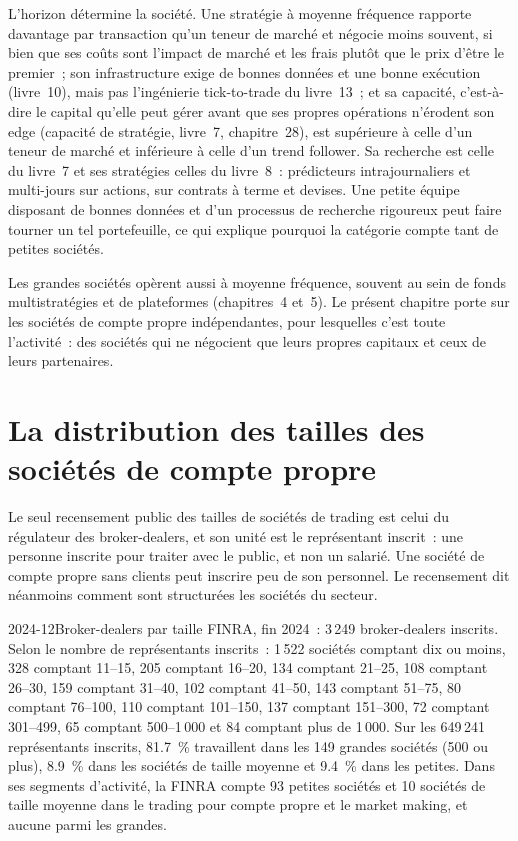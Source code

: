 L'horizon détermine la société. Une stratégie à moyenne fréquence rapporte davantage par transaction qu'un teneur de marché et négocie moins
souvent, si bien que ses coûts sont l'impact de marché et les frais plutôt que le prix d'être le premier~; son infrastructure exige de bonnes données
et une bonne exécution (livre~10), mais pas l'ingénierie tick-to-trade du livre~13~; et sa capacité, c'est-à-dire le capital qu'elle peut gérer avant
que ses propres opérations n'érodent son edge (capacité de stratégie, livre~7, chapitre~28), est supérieure à celle d'un teneur de marché et inférieure à
celle d'un trend follower. Sa recherche est celle du livre~7 et ses stratégies celles du livre~8~: prédicteurs intrajournaliers et multi-jours sur actions,
sur contrats à terme et devises. Une petite équipe disposant de bonnes données et d'un processus de recherche rigoureux peut faire tourner un tel portefeuille, ce qui explique
pourquoi la catégorie compte tant de petites sociétés.

\begin{remark}\label{rem:in:medium-frequency-proprietary-shops:large}
Les grandes sociétés opèrent aussi à moyenne fréquence, souvent au sein de fonds multistratégies et de plateformes (chapitres~4 et~5). Le
présent chapitre porte sur les sociétés de compte propre indépendantes, pour lesquelles c'est toute l'activité~: des sociétés qui ne négocient que leurs propres
capitaux et ceux de leurs partenaires.
\end{remark}

\section{La distribution des tailles des sociétés de compte propre}

Le seul recensement public des tailles de sociétés de trading est celui du régulateur des broker-dealers, et son unité est le
représentant inscrit~: une personne inscrite pour traiter avec le public, et non un salarié. Une société de compte propre sans clients peut
inscrire peu de son personnel. Le recensement dit néanmoins comment sont structurées les sociétés du secteur.

\begin{dated}{2024-12}{Broker-dealers par taille}\label{dat:in:medium-frequency-proprietary-shops:sizes}
FINRA, fin 2024~: 3\,249 broker-dealers inscrits. Selon le nombre de représentants inscrits~: 1\,522 sociétés comptant dix ou moins,
328 comptant 11--15, 205 comptant 16--20, 134 comptant 21--25, 108 comptant 26--30, 159 comptant 31--40, 102 comptant 41--50, 143 comptant 51--75, 80 comptant
76--100, 110 comptant 101--150, 137 comptant 151--300, 72 comptant 301--499, 65 comptant 500--1\,000 et 84 comptant plus de 1\,000. Sur les
649\,241 représentants inscrits, 81.7~\% travaillent dans les 149 grandes sociétés (500 ou plus), 8.9~\% dans les sociétés de taille moyenne et
9.4~\% dans les petites. Dans ses segments d'activité, la FINRA compte 93 petites sociétés et 10 sociétés de taille moyenne
dans le trading pour compte propre et le market making, et aucune parmi les grandes.
\end{dated}

